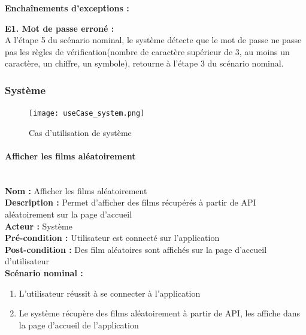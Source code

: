 \documentclass[12pt]{article}
\begin{document}
\textbf{Enchaînements d'exceptions : }
\begin{description}
    \item \textbf{E1. Mot de passe erroné :} \\ 
    A l'étape 5 du scénario nominal, le système détecte que le mot de passe ne passe pas les règles de vérification(nombre de caractère supérieur de 3, au moins un caractère, un chiffre, un symbole), retourne à l'étape 3 du scénario nominal.
\end{description}

\subsubsection{Système}
\begin{figure}[H]
    \centering
    \texttt{[image: useCase\_system.png]}
    \caption{Cas d'utilisation de système}
    \label{fig:useCase_system}
\end{figure}

\paragraph{Afficher les films aléatoirement}
\leavevmode \\
\textbf{Nom :} Afficher les films aléatoirement\\
\textbf{Description :} Permet d'afficher des films récupérés à partir de API aléatoirement sur la page d'accueil  \\
\textbf{Acteur :} Système\\
\textbf{Pré-condition : } Utilisateur est connecté sur l'application \\
\textbf{Post-condition : } Des film aléatoires sont affichés sur la page d'accueil d'utilisateur\\
\textbf{Scénario nominal : }
\begin{enumerate}
    \item L'utilisateur réussit à se connecter à l'application
    \item Le système récupère des films aléatoirement à partir de API, les affiche dans la page d'accueil de l'application
\end{enumerate}
\end{document}
